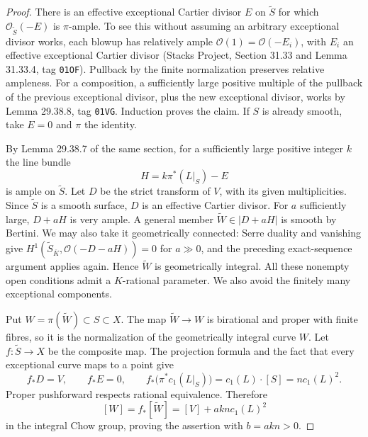 \documentclass[11pt,a4paper]{article}
\begin{document}
\begin{proof}
There is an effective exceptional Cartier divisor $E$ on
$\widetilde S$ for which $\mathcal O_{\widetilde S}(-E)$ is
$\pi$-ample.  To see this without assuming an arbitrary exceptional
divisor works, each blowup has relatively ample
$\mathcal O(1)=\mathcal O(-E_i)$, with $E_i$ an effective exceptional
Cartier divisor (Stacks Project, Section 31.33 and Lemma 31.33.4, tag
\texttt{01OF}).  Pullback by the finite normalization preserves
relative ampleness.  For a composition, a sufficiently large positive
multiple of the pullback of the previous exceptional divisor, plus
the new exceptional divisor, works by Lemma 29.38.8, tag
\texttt{01VG}.  Induction proves the claim.  If $S$ is already smooth,
take $E=0$ and $\pi$ the identity.

By Lemma 29.38.7 of the same section, for a sufficiently large positive
integer $k$ the line bundle
\[
 H=k\pi^*(L|_S)-E
\]
is ample on $\widetilde S$.  Let $D$ be the strict transform of $V$,
with its given multiplicities.  Since $\widetilde S$ is a smooth
surface, $D$ is an effective Cartier divisor.  For $a$ sufficiently
large, $D+aH$ is very ample.  A general member
$\widetilde W\in|D+aH|$ is smooth by Bertini.  We may also take it
geometrically connected: Serre duality and vanishing give
$H^1(\widetilde S_{\overline K},\mathcal O(-D-aH))=0$ for $a\gg0$,
and the preceding exact-sequence argument applies again.  Hence
$\widetilde W$ is geometrically integral.  All these nonempty open
conditions admit a $K$-rational parameter.  We also avoid the finitely
many exceptional components.

Put $W=\pi(\widetilde W)\subset S\subset X$.  The map
$\widetilde W\to W$ is birational and proper with finite fibres, so it
is the normalization of the geometrically integral curve $W$.  Let
$f:\widetilde S\to X$ be the composite map.  The projection formula
and the fact that every exceptional curve maps to a point give
\[
 f_*D=V,\qquad f_*E=0,\qquad
 f_*\bigl(\pi^*c_1(L|_S)\bigr)=c_1(L)\cdot[S]
 =n c_1(L)^2.
\]
Proper pushforward respects rational equivalence.  Therefore
\[
 [W]=f_*[\widetilde W]=[V]+ak n c_1(L)^2
\]
in the integral Chow group, proving the assertion with $b=akn>0$.


\end{proof}
\end{document}
